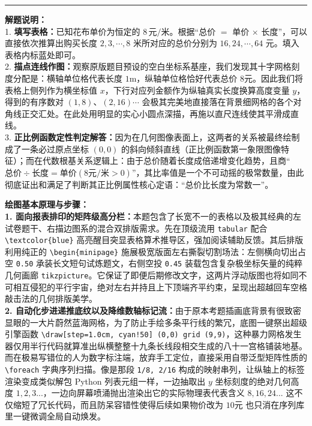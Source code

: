 \vspace{0.8cm}
\hrule
\vspace{0.4cm}

{\small\color{gray}
\textbf{解题说明：}\\
1. \textbf{填写表格：}已知花布单价为恒定的 $8\,\text{元/米}$。根据“总价 $=$ 单价 $\times$ 长度”，可以直接依次推算出购买长度 $2, 3, \cdots, 8$ 米所对应的总价分别为 $16, 24, \cdots, 64$ 元。填入表格内标蓝处即可。\\
2. \textbf{描点连线作图：}观察原版题目预设的空白坐标系基座，我们发现其十字网格刻度分配是：横轴单位格代表长度 $1\text{m}$，纵轴单位格恰好代表总价 $8\text{元}$。因此我们将表格上侧列作为横坐标值 $x$，下行对应列金额作为纵轴真实长度换算高度变量 $y$，得到的有序数对 $(1,8)、(2,16) \cdots$ 会极其完美地直接落在背景细网格的各个对角线正交汇处。在此处用明显的实心小圆点深描，再施以直尺连线使其平滑成直线。\\
3. \textbf{正比例函数定性判定解答：}因为在几何图像表面上，这两者的关系被最终绘制成了一条必过原点坐标 $(0,0)$ 的斜向倾斜直线（正比例函数第一象限图像特征）；而在代数根基关系逻辑上：由于总价随着长度成倍递增变化趋势，且商“$\text{总价} \div \text{长度} = \text{单价}(8\text{元/米} > 0)$”，其比率值是一个不可动摇的极常数量，由此彻底证出和满足了判断其正比例属性核心定语：“总价比长度为常数一”。
}

\vspace{0.6cm}

{\small\color{blue!70!black}
\textbf{绘图基本原理与步骤：}\\
\textbf{1. 面向报表排印的矩阵级高分栏：}本题包含了长宽不一的表格以及极其经典的左试卷题干、右描边图系的混合双排版需求。先在顶级流用 \texttt{tabular} 配合 \texttt{\textbackslash textcolor\{blue\}} 高亮醒目突显表格算术推导区，强加阅读辅助反馈。其后排版利用纯正的 \texttt{\textbackslash begin\{minipage\}} 施展极宽版面左右撕裂切割场法：左侧横向切出占空 \texttt{0.50} 承装长文短句试炼题文，右侧空投 \texttt{0.45} 装载包含复杂极坐标矢量的纯粹几何画廊 \texttt{tikzpicture}。它保证了即便后期修改文字，这两片浮动版图也将如同不可相互侵犯的平行宇宙，绝对左右并持且上下顶端齐平约束，呈现出超越回车空格敲击法的几何排版美学。\\
\textbf{2. 自动化步进递推底纹以及降维数轴标记流：}由于原本考题插画底背景有很致密显眼的一大片蔚然蓝海网格，为了防止手绘多条平行线的繁冗，底图一键祭出超级引擎函数 \texttt{\textbackslash draw[step=1.0cm, cyan!50] (0,0) grid (9,9)}，这种暴力网格发生器仅用半行代码就算准出纵横整整十九条长线段相交生成的八十一宫格铺装地基。而在极易写错位的人为数字标注端，放弃手工定位，直接采用自带泛型矩阵性质的 \texttt{\textbackslash foreach} 字典序列扫描。像是那段 \texttt{1/8, 2/16} 构成的映射串列，让纵轴上的标签渲染变成类似解包 Python 列表元组一样，一边抽取出 $y$ 坐标刻度的绝对几何高度 $1,2,3...$，一边向屏幕喷涌抛出渲染出它的实际物理表代表含义 $8,16,24...$ 这不仅缩短了冗长代码，而且防呆容错性使得后续如果物价改为 $10\text{元}$ 也只消在序列库里一键微调全局自动焕发。
}

